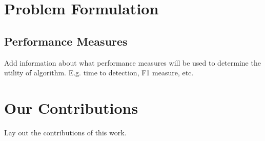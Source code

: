 
\section{Problem Formulation}



\subsection{Performance Measures}
Add information about what performance measures will be used to determine the utility of algorithm. E.g. time to detection, F1 measure, etc.

 

\section{Our Contributions}
Lay out the contributions of this work.